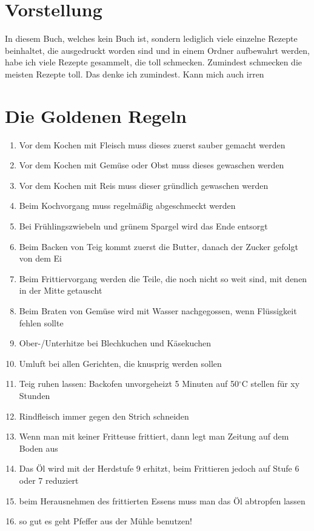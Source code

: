 \section{Vorstellung}
In diesem Buch, welches kein Buch ist, sondern lediglich viele einzelne Rezepte beinhaltet, die ausgedruckt worden sind und in einem Ordner aufbewahrt werden, habe ich viele Rezepte gesammelt, die toll schmecken. Zumindest schmecken die meisten Rezepte toll. Das denke ich zumindest. Kann mich auch irren

\newpage
\section{Die Goldenen Regeln}
\begin{enumerate}[label=\Roman*]
	\item Vor dem Kochen mit Fleisch muss dieses zuerst sauber gemacht werden
	\item Vor dem Kochen mit Gemüse oder Obst muss dieses gewaschen werden
	\item Vor dem Kochen mit Reis muss dieser gründlich gewaschen werden
	\item Beim Kochvorgang muss regelmäßig abgeschmeckt werden
	\item Bei Frühlingszwiebeln und grünem Spargel wird das Ende entsorgt
	\item Beim Backen von Teig kommt zuerst	 die Butter, danach der Zucker gefolgt von dem Ei
	\item Beim Frittiervorgang werden die Teile, die noch nicht so weit sind, mit denen in der Mitte getauscht
	\item Beim Braten von Gemüse wird mit Wasser nachgegossen, wenn Flüssigkeit fehlen sollte
	\item Ober-/Unterhitze bei Blechkuchen und Käsekuchen
	\item Umluft bei allen Gerichten, die knusprig werden sollen
	\item Teig ruhen lassen: Backofen unvorgeheizt 5 Minuten auf 50$^\circ$C stellen für xy Stunden
	\item Rindfleisch immer gegen den Strich schneiden
	\item Wenn man mit keiner Fritteuse frittiert, dann legt man Zeitung auf dem Boden aus
	\item Das Öl wird mit der Herdstufe 9 erhitzt, beim Frittieren jedoch auf Stufe 6 oder 7 reduziert
	\item beim Herausnehmen des frittierten Essens muss man das Öl abtropfen lassen
	\item so gut es geht Pfeffer aus der Mühle benutzen!
\end{enumerate}

